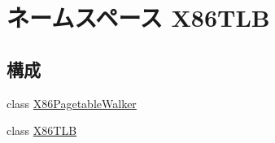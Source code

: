 \hypertarget{namespaceX86TLB}{
\section{ネームスペース X86TLB}
\label{namespaceX86TLB}
}
\subsection*{構成}
\begin{DoxyCompactItemize}
\item 
class \hyperlink{classX86TLB_1_1X86PagetableWalker}{X86PagetableWalker}
\item 
class \hyperlink{classX86TLB_1_1X86TLB}{X86TLB}
\end{DoxyCompactItemize}
